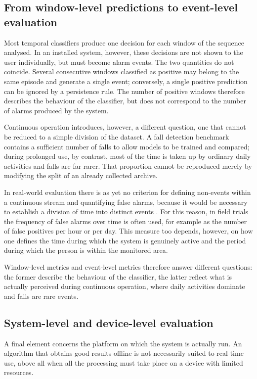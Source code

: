 \subsection{From window-level predictions to event-level evaluation}

Most temporal classifiers produce one decision for each window of the sequence analysed. In an installed system, however, these decisions are not shown to the user individually, but must become alarm events.
The two quantities do not coincide. Several consecutive windows classified as positive may belong to the same episode and generate a single event; conversely, a single positive prediction can be ignored by a persistence rule. The number of positive windows therefore describes the behaviour of the classifier, but does not correspond to the number of alarms produced by the system.

Continuous operation introduces, however, a different question, one that cannot be reduced to a simple division of the dataset. A fall detection benchmark contains a sufficient number of falls to allow models to be trained and compared; during prolonged use, by contrast, most of the time is taken up by ordinary daily activities and falls are far rarer. That proportion cannot be reproduced merely by modifying the split of an already collected archive.

In real-world evaluation there is as yet no criterion for defining non-events within a continuous stream and quantifying false alarms, because it would be necessary to establish a division of time into distinct events \cite{BR}. For this reason, in field trials the frequency of false alarms over time is often used, for example as the number of false positives per hour or per day. This measure too depends, however, on how one defines the time during which the system is genuinely active and the period during which the person is within the monitored area.

Window-level metrics and event-level metrics therefore answer different questions: the former describe the behaviour of the classifier, the latter reflect what is actually perceived during continuous operation, where daily activities dominate and falls are rare events.

\subsection{System-level and device-level evaluation}

A final element concerns the platform on which the system is actually run. An algorithm that obtains good results offline is not necessarily suited to real-time use, above all when all the processing must take place on a device with limited resources.

